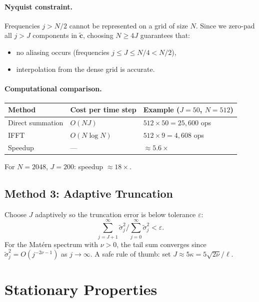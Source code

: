\documentclass[12pt]{article}
\begin{document}
\paragraph{Nyquist constraint.}
Frequencies $j > N/2$ cannot be represented on a grid of size $N$. Since we zero-pad all
$j > J$ components in $\tilde{\mathbf{c}}$, choosing $N \geq 4J$ guarantees that:
\begin{itemize}[noitemsep]
  \item no aliasing occurs (frequencies $j \leq J \leq N/4 < N/2$),
  \item interpolation from the dense grid is accurate.
\end{itemize}

\paragraph{Computational comparison.}

\begin{center}
\begin{tabular}{@{}lll@{}}
\toprule
\textbf{Method} & \textbf{Cost per time step} & \textbf{Example ($J{=}50$, $N{=}512$)} \\
\midrule
Direct summation & $O(NJ)$       & $512 \times 50 = 25{,}600$ ops \\
IFFT             & $O(N\log N)$  & $512 \times 9 = 4{,}608$ ops \\
Speedup          & ---           & $\approx 5.6\times$ \\
\bottomrule
\end{tabular}
\end{center}
For $N = 2048$, $J = 200$: speedup $\approx 18\times$.

\subsection{Method 3: Adaptive Truncation}

Choose $J$ adaptively so the truncation error is below tolerance $\varepsilon$:
\[
  \sum_{j=J+1}^{\infty} \tilde{\sigma}_j^2 \Big/ \sum_{j=0}^{\infty} \tilde{\sigma}_j^2 < \varepsilon.
\]
For the Mat\'{e}rn spectrum with $\nu > 0$, the tail sum converges since
$\tilde{\sigma}_j^2 = O(j^{-2\nu-1})$ as $j \to \infty$.
A safe rule of thumb: set $J \approx 5\kappa = 5\sqrt{2\nu}/\ell$.

\section{Stationary Properties}
\end{document}
